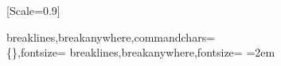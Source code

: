 \usepackage{amsmath,amssymb}
\usepackage{fontspec}
\setmainfont{FiraCode Nerd Font}
\setmonofont{FiraCode Nerd Font Mono}[Scale=0.9]
\usepackage{microtype}
\usepackage{graphicx}
\usepackage{float}
\makeatletter
\def\fps@figure{H} %
\makeatother
\usepackage[section]{placeins} %
\hypersetup{colorlinks=true, linkcolor=blue, urlcolor=blue}
\usepackage{setspace}

\usepackage{fvextra}           %
%
 {breaklines,breakanywhere,commandchars=\\\{\},fontsize=\small}
%
 {breaklines,breakanywhere,fontsize=\small}
\emergencystretch=2em

\usepackage{framed,xcolor}
